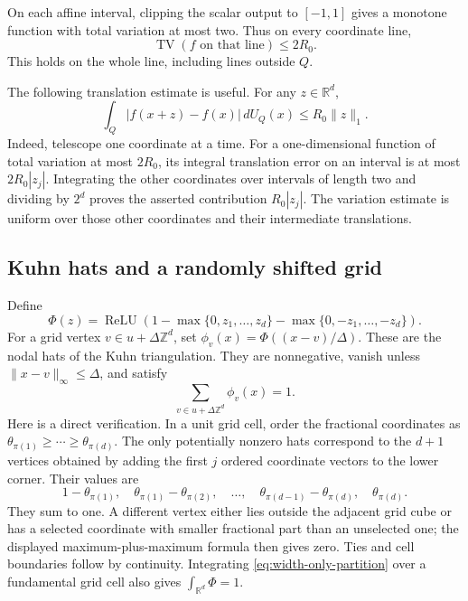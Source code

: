 On each affine interval, clipping the scalar output to $[-1,1]$ gives a monotone function with total variation at most two. Thus on every coordinate line,
\begin{equation}
 \operatorname{TV}(f\text{ on that line})\le2R_0.
 \label{eq:width-only-line-TV}
\end{equation}
This holds on the whole line, including lines outside $Q$.

The following translation estimate is useful. For any $z\in\mathbb R^d$,
\begin{equation}
 \int_Q|f(x+z)-f(x)|\,dU_Q(x)\le R_0\|z\|_1.
 \label{eq:width-only-translation}
\end{equation}
Indeed, telescope one coordinate at a time. For a one-dimensional function of total variation at most $2R_0$, its integral translation error on an interval is at most $2R_0|z_j|$. Integrating the other coordinates over intervals of length two and dividing by $2^d$ proves the asserted contribution $R_0|z_j|$. The variation estimate is uniform over those other coordinates and their intermediate translations.

\subsection{Kuhn hats and a randomly shifted grid}
Define
\[
 \Phi(z)=\operatorname{ReLU}\!\left(1-
       \max\{0,z_1,\ldots,z_d\}
       -\max\{0,-z_1,\ldots,-z_d\}\right).
\]
For a grid vertex $v\in u+\Delta\mathbb Z^d$, set
$\phi_v(x)=\Phi((x-v)/\Delta)$. These are the nodal hats of the Kuhn triangulation. They are nonnegative, vanish unless $\|x-v\|_\infty\le\Delta$, and satisfy
\begin{equation}
 \sum_{v\in u+\Delta\mathbb Z^d}\phi_v(x)=1.
 \label{eq:width-only-partition}
\end{equation}
Here is a direct verification. In a unit grid cell, order the fractional coordinates as $\theta_{\pi(1)}\ge\cdots\ge\theta_{\pi(d)}$. The only potentially nonzero hats correspond to the $d+1$ vertices obtained by adding the first $j$ ordered coordinate vectors to the lower corner. Their values are
\[
 1-\theta_{\pi(1)},\quad
 \theta_{\pi(1)}-\theta_{\pi(2)},\quad\ldots,\quad
 \theta_{\pi(d-1)}-\theta_{\pi(d)},\quad
 \theta_{\pi(d)}.
\]
They sum to one. A different vertex either lies outside the adjacent grid cube or has a selected coordinate with smaller fractional part than an unselected one; the displayed maximum-plus-maximum formula then gives zero. Ties and cell boundaries follow by continuity. Integrating \eqref{eq:width-only-partition} over a fundamental grid cell also gives $\int_{\mathbb R^d}\Phi=1$.

